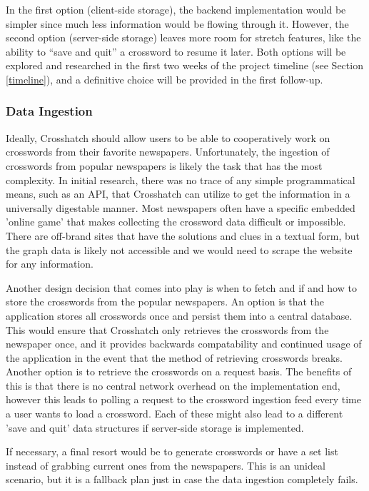 \documentclass{article}
\begin{document}
In the first option (client-side storage), the backend implementation would be simpler since much less information
would be flowing through it. However, the second option (server-side storage) leaves more room
for stretch features, like the ability to ``save and quit'' a crossword to resume it later.
Both options will be explored and researched in the first two weeks of the project timeline (see Section \ref{timeline}), and a definitive choice will be provided in the first follow-up.

\subsubsection{Data Ingestion}
\label{ingestarch}
Ideally, Crosshatch should allow users to be able to cooperatively work on crosswords from their favorite newspapers.
Unfortunately, the ingestion of crosswords from popular newspapers is likely the task that has the most complexity. In initial
research, there was no trace of any simple programmatical means, such as an API, that Crosshatch can utilize to get the information in
a universally digestable manner.  Most newspapers often have a specific embedded 'online game' that makes collecting
the crossword data difficult or impossible. There are off-brand sites that have the solutions and clues in a textual form,
but the graph data is likely not accessible and we would need to scrape the website for any information.

Another design decision that comes into play is when to fetch and if and how to store the crosswords from 
the popular newspapers. An option is that the application stores all crosswords once and persist them into a central database. This would
ensure that Crosshatch only retrieves the crosswords from the newspaper once, and it provides backwards compatability and continued 
usage of the application in the event that the method of retrieving crosswords breaks. Another option is to retrieve the
crosswords on a request basis. The benefits of this is that there is no central network overhead on the implementation
end, however this leads to polling a request to the crossword ingestion feed every time a user wants to load a crossword.
Each of these might also lead to a different 'save and quit' data structures if server-side storage is implemented.

If necessary, a final resort would be to generate crosswords or have a set list 
instead of grabbing current ones from the newspapers. This is an unideal scenario, but it is a fallback plan just in
case the data ingestion completely fails.
\end{document}
